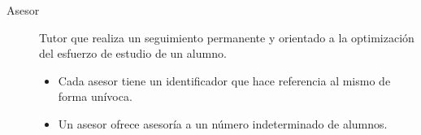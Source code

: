 \begin{description}
      \item[Asesor] Tutor que realiza un seguimiento permanente y orientado a la
      optimización del esfuerzo de estudio de un alumno.
      \begin{itemize}
         \item Cada asesor tiene un identificador que hace referencia al mismo
         de forma unívoca.
         \item Un asesor ofrece asesoría a un número indeterminado de alumnos.
      \end{itemize}

 \end{description}
